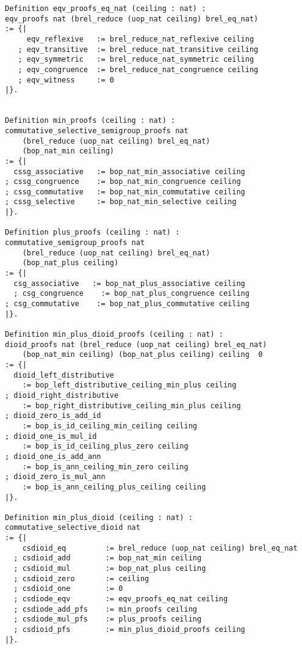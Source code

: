 \documentclass[a4paper,12pt,twoside,openright]{report}
\begin{document}
\begin{lstlisting}
Definition eqv_proofs_eq_nat (ceiling : nat) : 
eqv_proofs nat (brel_reduce (uop_nat ceiling) brel_eq_nat)
:= {| 
     eqv_reflexive   := brel_reduce_nat_reflexive ceiling
   ; eqv_transitive  := brel_reduce_nat_transitive ceiling
   ; eqv_symmetric   := brel_reduce_nat_symmetric ceiling
   ; eqv_congruence  := brel_reduce_nat_congruence ceiling
   ; eqv_witness     := 0
|}. 


Definition min_proofs (ceiling : nat) : 
commutative_selective_semigroup_proofs nat 
	(brel_reduce (uop_nat ceiling) brel_eq_nat) 
	(bop_nat_min ceiling) 
:= {|
  cssg_associative   := bop_nat_min_associative ceiling
; cssg_congruence    := bop_nat_min_congruence ceiling
; cssg_commutative   := bop_nat_min_commutative ceiling
; cssg_selective     := bop_nat_min_selective ceiling                                         
|}.

Definition plus_proofs (ceiling : nat) : 
commutative_semigroup_proofs nat 
	(brel_reduce (uop_nat ceiling) brel_eq_nat) 
	(bop_nat_plus ceiling) 
:= {|
  csg_associative   := bop_nat_plus_associative ceiling
  ; csg_congruence    := bop_nat_plus_congruence ceiling
; csg_commutative    := bop_nat_plus_commutative ceiling                                                 
|}.

Definition min_plus_dioid_proofs (ceiling : nat) : 
dioid_proofs nat (brel_reduce (uop_nat ceiling) brel_eq_nat) 
	(bop_nat_min ceiling) (bop_nat_plus ceiling) ceiling  0 
:= {|  
  dioid_left_distributive  
  	:= bop_left_distributive_ceiling_min_plus ceiling
; dioid_right_distributive 
	:= bop_right_distributive_ceiling_min_plus ceiling
; dioid_zero_is_add_id     
	:= bop_is_id_ceiling_min_ceiling ceiling 
; dioid_one_is_mul_id      
	:= bop_is_id_ceiling_plus_zero ceiling 
; dioid_one_is_add_ann     
	:= bop_is_ann_ceiling_min_zero ceiling    
; dioid_zero_is_mul_ann    
	:= bop_is_ann_ceiling_plus_ceiling ceiling 
|}.

Definition min_plus_dioid (ceiling : nat) : 
commutative_selective_dioid nat 
:= {|
    csdioid_eq         := brel_reduce (uop_nat ceiling) brel_eq_nat
  ; csdioid_add        := bop_nat_min ceiling
  ; csdioid_mul        := bop_nat_plus ceiling                                  
  ; csdioid_zero       := ceiling
  ; csdioid_one        := 0
  ; csdiode_eqv        := eqv_proofs_eq_nat ceiling
  ; csdiode_add_pfs    := min_proofs ceiling 
  ; csdiode_mul_pfs    := plus_proofs ceiling                                      
  ; csdioid_pfs        := min_plus_dioid_proofs ceiling 
|}.
\end{lstlisting}
\end{document}
